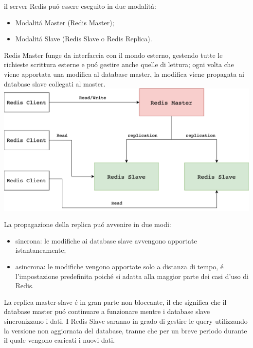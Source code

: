 il server Redis puó essere eseguito in due modalitá:
\begin{itemize}
    \item Modalitá Master (Redis Master);
    \item Modalitá Slave (Redis Slave o Redis Replica).
\end{itemize}


Redis Master funge da interfaccia con il mondo esterno, gestendo tutte le richieste scrittura esterne e puó gestire anche
quelle di lettura;
ogni volta che viene apportata una modifica al database master, la modifica viene propagata ai database slave collegati al master.\\

\includegraphics[width=1\textwidth]{img/masterslaveRedis}

La propagazione della replica puó avvenire in due modi:
\begin{itemize}
    \item sincrona: le modifiche ai database slave avvengono apportate istantaneamente;
    \item asincrona: le modifiche vengono apportate solo a distanza di tempo, é l'impostazione predefinita poiché si adatta
    alla maggior parte dei casi d'uso di Redis.
\end{itemize}

La replica master-slave é in gran parte non bloccante, il che significa che il database master puó continuare a funzionare
mentre i database slave sincronizzano i dati.
I Redis Slave saranno in grado di gestire le query utilizzando la versione non aggiornata del database, tranne che per un breve
periodo durante il quale vengono caricati i nuovi dati.

